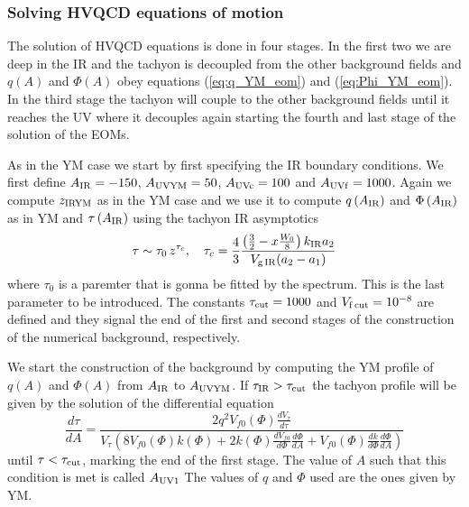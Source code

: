 \documentclass[a4paper,12pt]{article}
\begin{document}
\subsubsection*{Solving HVQCD equations of motion}

The solution of HVQCD equations is done in four stages. In the first two we are deep in the IR and the tachyon is decoupled from the other background fields and $q\left(A\right)$ and $\Phi\left(A\right)$ obey equations (\ref{eq:q_YM_eom}) and (\ref{eq:Phi_YM_eom}). In the third stage the tachyon will couple to the other background fields until it reaches the UV where it decouples again starting the fourth and last stage of the solution of the EOMs.

As in the YM case we start by first specifying the IR boundary conditions. We first define $A_{\rm{IR}} = -150$, $A_{\rm{UVYM}} = 50$, $A_{\rm{UVc}} = 100$ and $A_{\rm{UVf}} = 1000$.
Again  we compute $z_{\rm{IRYM}}$ as in the YM case and we use it to compute $q\left(A_{\rm{IR}}\right)$ and $\Phi\left(A_{\rm{IR}}\right)$ as in YM and $\tau\left(A_{\rm{IR}}\right)$ using the tachyon IR asymptotics
\begin{equation}
\tau \sim \tau_0 \, z^{\tau_c}, \quad \tau_c = \frac{4}{3} \frac{\left(\frac{3}{2} - x \frac{W_0}{8}\right) k_{\rm{IR}} a_2}{V_{\rm{g\,IR}} (a_2 - a_1)}
\end{equation}
where $\tau_0$ is a paremter that is gonna be fitted by the spectrum. This is the last parameter to be introduced.
The constants $\tau_{\rm{cut}} = 1000$ and $V_{\rm{f \, cut}} = 10^{-8}$ are defined and they signal the end of the first and second stages of the construction of the numerical background, respectively.

We start the construction of the background by computing the YM profile of $q\left(A\right)$ and $\Phi\left(A\right)$ from $A_{\rm{IR}}$ to $A_{\rm{UVYM}}$. If $\tau_{\rm{IR}} > \tau_{\rm{cut}}$ the tachyon profile will be given by the solution of the differential equation
\begin{equation}
	\frac{d\tau}{dA} =  \frac{2 q^2 V_{f0} \left(\Phi\right)\frac{d V_{\tau}}{d\tau} } {V_\tau \left(8 V_{f0}\left( \Phi\right) k\left(\Phi\right) + 2 k\left(\Phi\right) \frac{d V_{f0}}{d\Phi} \frac{d\Phi}{dA} + V_{f0} \left(\Phi\right) \frac{dk}{d\Phi} \frac{d\Phi}{dA} \right) }
\end{equation}
until $\tau < \tau_{\rm{cut}}$, marking the end of the first stage. The value of $A$ such that this condition is met is called $A_{\rm{UV1}}$ The values of $q$ and $\Phi$ used are the ones given by YM.
\end{document}
